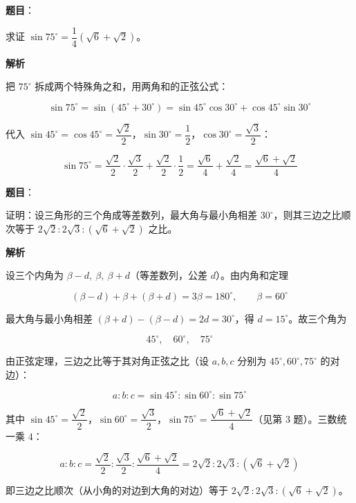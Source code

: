 \begin{answer}

\textbf{题目}：

求证 $\sin 75^\circ=\dfrac14\left(\sqrt6+\sqrt2\right)$。

\textbf{解析}

把 $75^\circ$ 拆成两个特殊角之和，用两角和的正弦公式：

\nopagebreak[4]
\[
\sin 75^\circ=\sin(45^\circ+30^\circ)=\sin45^\circ\cos30^\circ+\cos45^\circ\sin30^\circ
\]

代入 $\sin45^\circ=\cos45^\circ=\dfrac{\sqrt2}{2}$，$\sin30^\circ=\dfrac12$，$\cos30^\circ=\dfrac{\sqrt3}{2}$：

\nopagebreak[4]
\[
\sin 75^\circ=\frac{\sqrt2}{2}\cdot\frac{\sqrt3}{2}+\frac{\sqrt2}{2}\cdot\frac12=\frac{\sqrt6}{4}+\frac{\sqrt2}{4}=\frac{\sqrt6+\sqrt2}{4}
\]


\end{answer}
\begin{answer}

\textbf{题目}：

证明：设三角形的三个角成等差数列，最大角与最小角相差 $30^\circ$，则其三边之比顺次等于 $2\sqrt2:2\sqrt3:(\sqrt6+\sqrt2)$ 之比。

\textbf{解析}

设三个内角为 $\beta-d,\ \beta,\ \beta+d$（等差数列，公差 $d$）。由内角和定理

\nopagebreak[4]
\[
(\beta-d)+\beta+(\beta+d)=3\beta=180^\circ,\qquad \beta=60^\circ
\]

最大角与最小角相差 $(\beta+d)-(\beta-d)=2d=30^\circ$，得 $d=15^\circ$。故三个角为

\nopagebreak[4]
\[
45^\circ,\quad 60^\circ,\quad 75^\circ
\]

由正弦定理，三边之比等于其对角正弦之比（设 $a,b,c$ 分别为 $45^\circ,60^\circ,75^\circ$ 的对边）：

\nopagebreak[4]
\[
a:b:c=\sin45^\circ:\sin60^\circ:\sin75^\circ
\]

其中 $\sin45^\circ=\dfrac{\sqrt2}{2}$，$\sin60^\circ=\dfrac{\sqrt3}{2}$，$\sin75^\circ=\dfrac{\sqrt6+\sqrt2}{4}$（见第 3 题）。三数统一乘 $4$：

\nopagebreak[4]
\[
a:b:c=\frac{\sqrt2}{2}:\frac{\sqrt3}{2}:\frac{\sqrt6+\sqrt2}{4}=2\sqrt2:2\sqrt3:(\sqrt6+\sqrt2)
\]

即三边之比顺次（从小角的对边到大角的对边）等于 $2\sqrt2:2\sqrt3:(\sqrt6+\sqrt2)$。


\end{answer}
